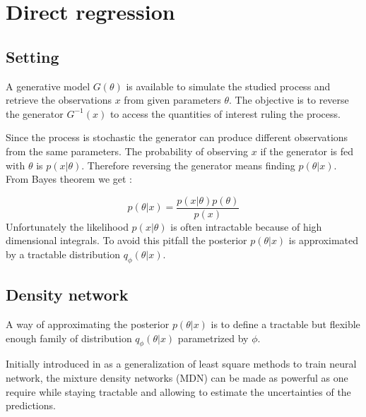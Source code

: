 \section{Direct regression}


\subsection{Setting}

A generative model $G(\theta)$ is available to simulate the studied process and retrieve the observations $x$ from given parameters $\theta$.
The objective is to reverse the generator $G^{-1}(x)$ to access the quantities of interest ruling the process.

Since the process is stochastic the generator can produce different observations from the same parameters.
The probability of observing $x$ if the generator is fed with $\theta$ is $p(x | \theta)$.
Therefore reversing the generator means finding $p(\theta | x)$.
From Bayes theorem we get :

\begin{equation}
    p(\theta | x) = \frac{p(x | \theta) p(\theta) }{p(x)}
\end{equation}
Unfortunately the likelihood $p(x | \theta)$ is often intractable because of high dimensional integrals.
To avoid this pitfall the posterior $p(\theta | x)$ is approximated by a tractable distribution $q_\phi(\theta | x)$.


\subsection{Density network}


A way of approximating the posterior $p(\theta | x)$ is to define a tractable but flexible enough family of distribution $q_\phi(\theta | x)$ parametrized by $\phi$.

Initially introduced in \cite{Bishop94mixturedensity} as a generalization of least square methods to train neural network, the mixture density networks (MDN) can be made as powerful as one require while staying tractable and allowing to estimate the uncertainties of the predictions.


